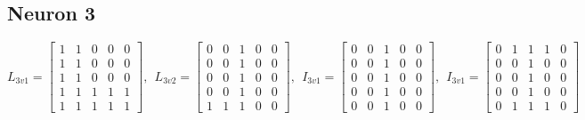 \documentclass{article}
\begin{document}
	\subsection{Neuron 3}
	\[
	L_{3v1} = 
	\begin{bmatrix}
	1 & 1 & 0 & 0 & 0 \\
	1 & 1 & 0 & 0 & 0 \\
	1 & 1 & 0 & 0 & 0 \\
	1 & 1 & 1 & 1 & 1 \\
	1 & 1 & 1 & 1 & 1
	\end{bmatrix}
	,~~L_{3v2} = 
	\begin{bmatrix}
	0 & 0 & 1 & 0 & 0 \\
	0 & 0 & 1 & 0 & 0 \\
	0 & 0 & 1 & 0 & 0 \\
	0 & 0 & 1 & 0 & 0 \\
	1 & 1 & 1 & 0 & 0
	\end{bmatrix}
	,~~I_{3v1} = 
	\begin{bmatrix}
	0 & 0 & 1 & 0 & 0 \\
	0 & 0 & 1 & 0 & 0 \\
	0 & 0 & 1 & 0 & 0 \\
	0 & 0 & 1 & 0 & 0 \\
	0 & 0 & 1 & 0 & 0
	\end{bmatrix}
	,~~I_{3v1} = 
	\begin{bmatrix}
	0 & 1 & 1 & 1 & 0 \\
	0 & 0 & 1 & 0 & 0 \\
	0 & 0 & 1 & 0 & 0 \\
	0 & 0 & 1 & 0 & 0 \\
	0 & 1 & 1 & 1 & 0
	\end{bmatrix}
	\]
\end{document}
